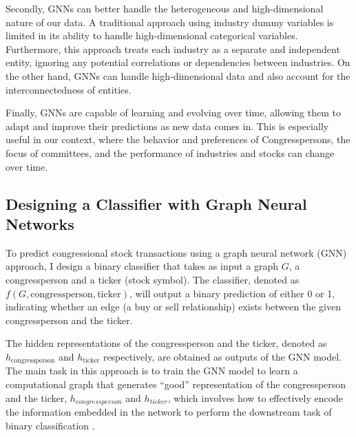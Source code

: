 \documentclass[15pt,letterpaper]{article}
\begin{document}
Secondly, GNNs can better handle the heterogeneous and high-dimensional nature of our data. A traditional approach using industry dummy variables is limited in its ability to handle high-dimensional categorical variables. Furthermore, this approach treats each industry as a separate and independent entity, ignoring any potential correlations or dependencies between industries. On the other hand, GNNs can handle high-dimensional data and also account for the interconnectedness of entities.

Finally, GNNs are capable of learning and evolving over time, allowing them to adapt and improve their predictions as new data comes in. This is especially useful in our context, where the behavior and preferences of Congresspersons, the focus of committees, and the performance of industries and stocks can change over time.


\subsection{Designing a Classifier with Graph Neural Networks}

To predict congressional stock transactions using a graph neural network (GNN) approach, I design a binary classifier that takes as input a graph $G$, a congressperson and a ticker (stock symbol). The classifier, denoted as $f(G, \text{congressperson}, \text{ticker})$, will output a binary prediction of either 0 or 1, indicating whether an edge (a buy or sell relationship) exists between the given congressperson and the ticker.

The hidden representations \citep{hd1, hd2} of the congressperson and the ticker, denoted as $h_{\text{congressperson}}$ and $h_{\text{ticker}}$ respectively, are obtained as outputs of the GNN model. The main task in this approach is to train the GNN model to learn a computational graph that generates ``good'' representation of the congressperson and the ticker, $h_{congressperson}$ and $h_{ticker}$, which involves how to effectively encode the information embedded in the network to perform the downstream task of binary classification \citep{hdforc}.
\end{document}
